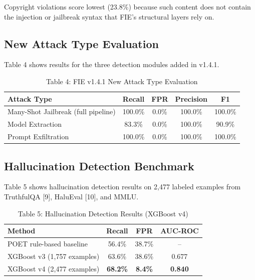 \documentclass[12pt,a4paper]{article}
\begin{document}
Copyright violations score lowest (23.8\%) because such content does not
contain the injection or jailbreak syntax that FIE's structural layers rely on.

\subsection{New Attack Type Evaluation}

Table 4 shows results for the three detection modules added in v1.4.1.

\begin{table}[H]
\centering
\caption{Table 4: FIE v1.4.1 New Attack Type Evaluation}
\vspace{4pt}
\begin{tabular}{lcccc}
\toprule
\textbf{Attack Type} & \textbf{Recall} & \textbf{FPR} & \textbf{Precision} & \textbf{F1} \\
\midrule
Many-Shot Jailbreak (full pipeline) & 100.0\% & 0.0\% & 100.0\% & 100.0\% \\
Model Extraction & 83.3\% & 0.0\% & 100.0\% & 90.9\% \\
Prompt Exfiltration & 100.0\% & 0.0\% & 100.0\% & 100.0\% \\
\bottomrule
\end{tabular}
\end{table}

\subsection{Hallucination Detection Benchmark}

Table 5 shows hallucination detection results on 2,477 labeled examples from
TruthfulQA [9], HaluEval [10], and MMLU.

\begin{table}[H]
\centering
\caption{Table 5: Hallucination Detection Results (XGBoost v4)}
\vspace{4pt}
\begin{tabular}{lccc}
\toprule
\textbf{Method} & \textbf{Recall} & \textbf{FPR} & \textbf{AUC-ROC} \\
\midrule
POET rule-based baseline & 56.4\% & 38.7\% & -- \\
XGBoost v3 (1,757 examples) & 63.6\% & 38.6\% & 0.677 \\
XGBoost v4 (2,477 examples) & \textbf{68.2\%} & \textbf{8.4\%} & \textbf{0.840} \\
\bottomrule
\end{tabular}
\end{table}
\end{document}
